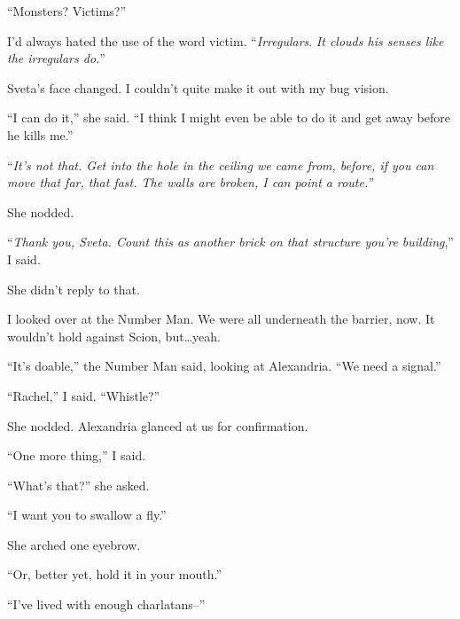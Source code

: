 ``Monsters?  Victims?''



I'd always hated the use of the word victim.  ``\emph{Irregulars}.  \emph{It clouds his senses like the irregulars do.}''



Sveta's face changed.  I couldn't quite make it out with my bug vision.



``I can do it,'' she said.  ``I think I might even be able to do it and get away before he kills me.''



``\emph{It's not that.  Get into the hole in the ceiling we came from, before, if you can move that far, that fast.  The walls are broken, I can point a route.''}



She nodded.



``\emph{Thank you, Sveta.  Count this as another brick on that structure you're building},'' I said.



She didn't reply to that.



I looked over at the Number Man.  We were all underneath the barrier, now.  It wouldn't hold against Scion, but\ldots yeah.



``It's doable,'' the Number Man said, looking at Alexandria.  ``We need a signal.''



``Rachel,'' I said.  ``Whistle?''



She nodded.  Alexandria glanced at us for confirmation.



``One more thing,'' I said.



``What's that?'' she asked.



``I want you to swallow a fly.''



She arched one eyebrow.



``Or, better yet, hold it in your mouth.''



``I've lived with enough charlatans--''



